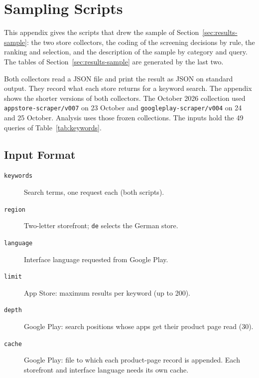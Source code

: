 \chapter{Sampling Scripts}
\label{app:scripts}
This appendix gives the scripts that drew the sample of Section~\ref{sec:results-sample}: the two
store collectors, the coding of the screening decisions by rule, the ranking and selection, and
the description of the sample by category and query. The tables of Section~\ref{sec:results-sample}
are generated by the last two.

Both collectors read a JSON file and print the result as JSON on standard
output. They record what each store returns for a keyword search. The appendix
shows the shorter versions of both collectors. The October 2026 collection used
\texttt{appstore-scraper/v007} on 23 October and
\texttt{googleplay-scraper/v004} on 24 and 25 October. Analysis uses those frozen
collections. The inputs
hold the 49 queries of Table~\ref{tab:keywords}.

\section{Input Format}
\begin{description}
  \item[\texttt{keywords}] Search terms, one request each (both scripts).
  \item[\texttt{region}] Two-letter storefront; \texttt{de} selects the German store.
  \item[\texttt{language}] Interface language requested from Google Play.
  \item[\texttt{limit}] App Store: maximum results per keyword (up to 200).
  \item[\texttt{depth}] Google Play: search positions whose apps get their
    product page read (30).
  \item[\texttt{cache}] Google Play: file to which each product-page record is
    appended. Each storefront and interface language needs its own cache.
\end{description}

